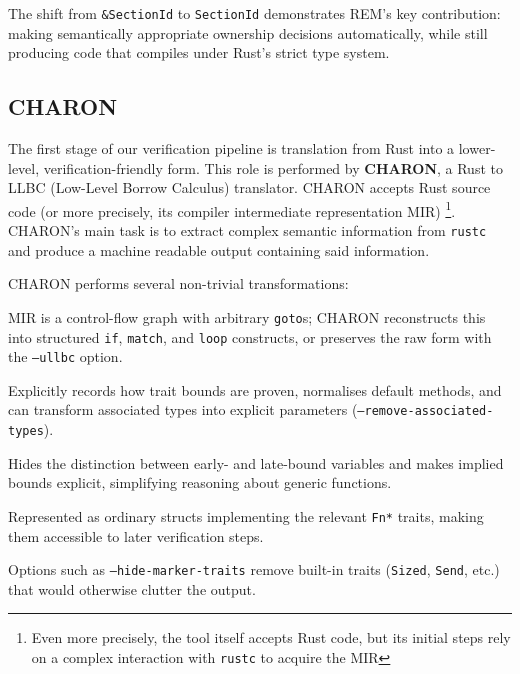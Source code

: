 The shift from \verb|&SectionId| to \verb|SectionId| demonstrates REM's key
contribution: making semantically appropriate ownership decisions automatically,
while still producing code that compiles under Rust's strict type system.

\subsection{CHARON}
\label{subsec:charon}

The first stage of our verification pipeline is translation from Rust into a lower-level, verification-friendly form. This role is performed by \textbf{CHARON}, a Rust to LLBC (Low-Level Borrow Calculus) translator. CHARON accepts Rust source code (or more precisely, its compiler intermediate representation MIR) \footnote{Even more precisely, the tool itself accepts Rust code, but its initial steps rely on a complex interaction with \texttt{rustc} to acquire the MIR}. CHARON's main task is to extract complex semantic information from \verb|rustc| and produce a machine readable output containing said information.

CHARON performs several non-trivial transformations:
\begin{description}[leftmargin=!,labelwidth=2cm]
  \item[Structured control flow.] MIR is a control-flow graph with arbitrary
  \texttt{goto}s; CHARON reconstructs this into structured \texttt{if},
  \texttt{match}, and \texttt{loop} constructs, or preserves the raw form with
  the \texttt{--ullbc} option.
  \item[Trait and type resolution.] Explicitly records how trait bounds are
  proven, normalises default methods, and can transform associated types into
  explicit parameters (\texttt{--remove-associated-types}).
  \item[Lifetime handling.] Hides the distinction between early- and late-bound
  variables and makes implied bounds explicit, simplifying reasoning about
  generic functions. \item[Closures and vtables.] Represented as ordinary
  structs implementing the relevant
  \texttt{Fn*} traits, making them accessible to later verification steps.
  \item[Noise reduction.] Options such as \texttt{--hide-marker-traits} remove
  built-in traits (\texttt{Sized}, \texttt{Send}, etc.) that would otherwise
  clutter the output.
\end{description}

